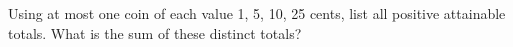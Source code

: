 Using at most one coin of each value 1, 5, 10, 25 cents, list all positive attainable totals. What is the sum of these distinct totals?
